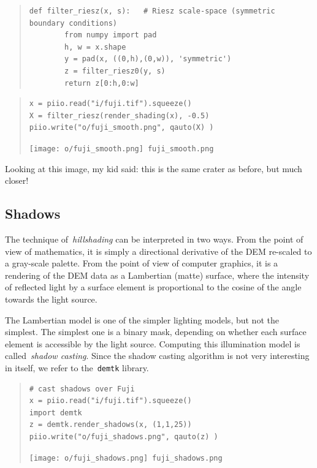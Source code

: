 \begin{quote}
\begin{verbatim}
def filter_riesz(x, s):   # Riesz scale-space (symmetric boundary conditions)
        from numpy import pad
        h, w = x.shape
        y = pad(x, ((0,h),(0,w)), 'symmetric')
        z = filter_riesz0(y, s)
        return z[0:h,0:w]
\end{verbatim}
\end{quote}

\begin{quote}
\begin{verbatim}
x = piio.read("i/fuji.tif").squeeze()
X = filter_riesz(render_shading(x), -0.5)
piio.write("o/fuji_smooth.png", qauto(X) )
\end{verbatim}
\texttt{[image: o/fuji\_smooth.png]}~\verb+fuji_smooth.png+
\end{quote}

Looking at this image, my kid said: this is the same crater as before, but
much closer!



\clearpage
\subsection{Shadows}

The technique of~\emph{hillshading} can be interpreted in two ways.
From the point of view of mathematics, it is simply a directional derivative
of the DEM re-scaled to a gray-scale palette.
From the point of view of computer graphics, it is a rendering of the DEM
data as a Lambertian (matte) surface, where the intensity of reflected light
by a surface element is proportional to the cosine of the angle towards the
light source.

The Lambertian model is one of the simpler lighting models, but not the
simplest.  The simplest one is a binary mask, depending on whether each
surface element is accessible by the light source.  Computing this
illumination model is called~\emph{shadow casting}.  Since the shadow casting
algorithm is not very interesting in itself, we refer to the~\verb+demtk+
library.

\begin{quote}
\begin{verbatim}
# cast shadows over Fuji
x = piio.read("i/fuji.tif").squeeze()
import demtk
z = demtk.render_shadows(x, (1,1,25))
piio.write("o/fuji_shadows.png", qauto(z) )
\end{verbatim}
\texttt{[image: o/fuji\_shadows.png]}~\verb+fuji_shadows.png+
\end{quote}

